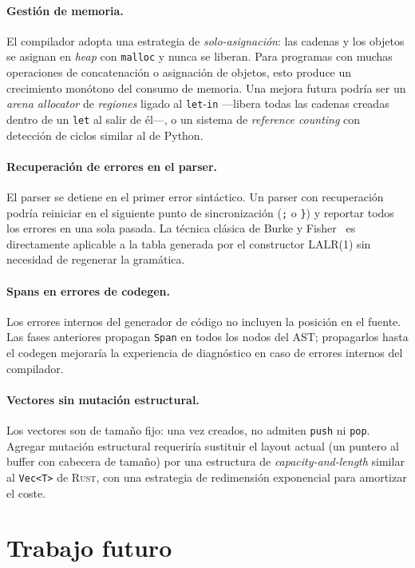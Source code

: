 \documentclass[11pt,a4paper,oneside,openany]{report}
\newcommand{\code}[1]{\texttt{#1}}
\newcommand{\rust}{\textsc{Rust}}
\begin{document}
\paragraph{Gestión de memoria.}
El compilador adopta una estrategia de \textit{solo-asignación}: las cadenas y
los objetos se asignan en \textit{heap} con \code{malloc} y nunca se liberan.
Para programas con muchas operaciones de concatenación o asignación de objetos,
esto produce un crecimiento monótono del consumo de memoria. Una mejora futura
podría ser un \textit{arena allocator} de \textit{regiones} ligado al
\code{let}-\code{in} ---libera todas las cadenas creadas dentro de un \code{let}
al salir de él---, o un sistema de \textit{reference counting} con
detección de ciclos similar al de Python.

\paragraph{Recuperación de errores en el parser.}
El parser se detiene en el primer error sintáctico. Un parser con recuperación
podría reiniciar en el siguiente punto de sincronización (\code{;} o \code{\}}) y
reportar todos los errores en una sola pasada. La técnica clásica de Burke y
Fisher~\cite{cooper2011} es directamente aplicable a la tabla generada por el
constructor LALR(1) sin necesidad de regenerar la gramática.

\paragraph{Spans en errores de codegen.}
Los errores internos del generador de código no incluyen la posición en el
fuente. Las fases anteriores propagan \code{Span} en todos los nodos del AST;
propagarlos hasta el codegen mejoraría la experiencia de diagnóstico en caso de
errores internos del compilador.

\paragraph{Vectores sin mutación estructural.}
Los vectores son de tamaño fijo: una vez creados, no admiten \code{push} ni
\code{pop}. Agregar mutación estructural requeriría sustituir el layout actual
(un puntero al buffer con cabecera de tamaño) por una estructura de
\textit{capacity-and-length} similar al \code{Vec<T>} de \rust{}, con una
estrategia de redimensión exponencial para amortizar el coste.

\section{Trabajo futuro}
\end{document}
